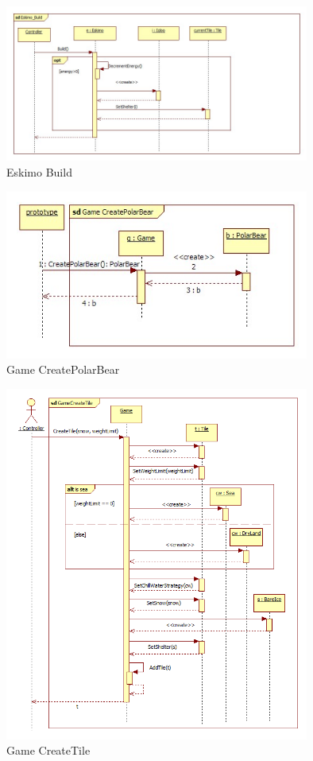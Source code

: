 \begin{figure}[H]
        \begin{center}
                \includegraphics[width=10cm]{chapters/chapter07/seqdiag/Eskimo_Build.jpg}
                \caption{Eskimo Build}
                \label{Eskimo Build}
        \end{center}
\end{figure}
\begin{figure}[H]
        \begin{center}
                \includegraphics[width=10cm]{chapters/chapter07/seqdiag/Game_CreatePolarBear.jpg}
                \caption{Game CreatePolarBear}
                \label{Game CreatePolarBear}
        \end{center}
\end{figure}
\begin{figure}[H]
        \begin{center}
                \includegraphics[width=10cm]{chapters/chapter07/seqdiag/Game_CreateTile.png}
                \caption{Game CreateTile}
                \label{Game CreateTile}
        \end{center}
\end{figure}
